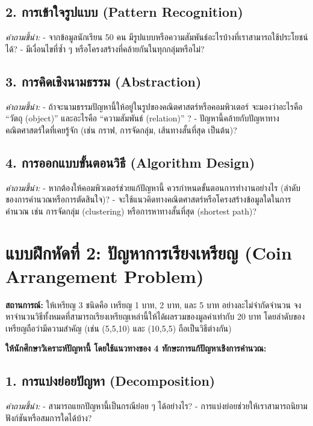\vspace{6em}

\subsection*{2. การเข้าใจรูปแบบ (Pattern Recognition)}
\textit{คำถามชี้นำ:}  
- จากข้อมูลนักเรียน 50 คน มีรูปแบบหรือความสัมพันธ์อะไรบ้างที่เราสามารถใช้ประโยชน์ได้?  
- มีเงื่อนไขที่ซ้ำ ๆ หรือโครงสร้างที่คล้ายกันในทุกกลุ่มหรือไม่?

\vspace{6em}
\subsection*{3. การคิดเชิงนามธรรม (Abstraction)}
\textit{คำถามชี้นำ:}  
- ถ้าจะนามธรรมปัญหานี้ให้อยู่ในรูปของคณิตศาสตร์หรือคอมพิวเตอร์ จะมองว่าอะไรคือ “วัตถุ (object)” และอะไรคือ “ความสัมพันธ์ (relation)” ?  
- ปัญหานี้คล้ายกับปัญหาทางคณิตศาสตร์ใดที่เคยรู้จัก (เช่น กราฟ, การจัดกลุ่ม, เส้นทางสั้นที่สุด เป็นต้น)?

\vspace{6em}
\subsection*{4. การออกแบบขั้นตอนวิธี (Algorithm Design)}
\textit{คำถามชี้นำ:}  
- หากต้องให้คอมพิวเตอร์ช่วยแก้ปัญหานี้ ควรกำหนดขั้นตอนการทำงานอย่างไร (ลำดับของการคำนวณหรือการตัดสินใจ)?  
- จะใช้แนวคิดทางคณิตศาสตร์หรือโครงสร้างข้อมูลใดในการคำนวณ เช่น การจัดกลุ่ม (clustering) หรือการหาทางสั้นที่สุด (shortest path)?

\vspace{6em}

\newpage
\section*{แบบฝึกหัดที่ 2: ปัญหาการเรียงเหรียญ (Coin Arrangement Problem)}

\textbf{สถานการณ์:}  
ให้เหรียญ 3 ชนิดคือ เหรียญ 1 บาท, 2 บาท, และ 5 บาท อย่างละไม่จำกัดจำนวน  
จงหาจำนวนวิธีทั้งหมดที่สามารถเรียงเหรียญเหล่านี้ให้ได้ผลรวมของมูลค่าเท่ากับ 20 บาท  
โดยลำดับของเหรียญถือว่ามีความสำคัญ (เช่น (5,5,10) และ (10,5,5) ถือเป็นวิธีต่างกัน)

\vspace{1em}
\textbf{ให้นักศึกษาวิเคราะห์ปัญหานี้ โดยใช้แนวทางของ 4 ทักษะการแก้ปัญหาเชิงการคำนวณ:}


\subsection*{1. การแบ่งย่อยปัญหา (Decomposition)}
\textit{คำถามชี้นำ:}  
- สามารถแยกปัญหานี้เป็นกรณีย่อย ๆ ได้อย่างไร?  
- การแบ่งย่อยช่วยให้เราสามารถนิยามฟังก์ชันหรือสมการใดได้บ้าง?

